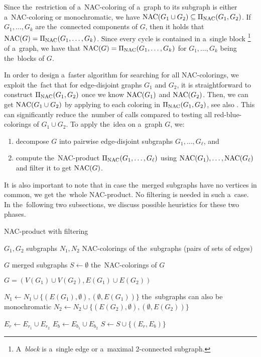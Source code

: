 Since the~restriction of a~NAC-coloring of a~graph
to its subgraph is either a~NAC-coloring or monochromatic,
we have $\operatorname{NAC}(G_{1} \cup G_{2}) \subseteq \operatorname{\Pi_{\operatorname{NAC}}}(G_{1}, G_{2})$.
If~$G_1, \dots, G_k$ are the~connected components of $G$,
then it holds that $\operatorname{NAC}(G) = \operatorname{\Pi_{\operatorname{NAC}}}(G_1,\ldots, G_k)$.
Since every cycle is contained in a~single
block%
\footnote{
	A~\emph{block} is a~single edge or a~maximal 2-connected subgraph.
}
of a~graph, we have that $\operatorname{NAC}(G) = \operatorname{\Pi_{\operatorname{NAC}}}(G_1,\ldots, G_k)$
for $G_1,\ldots, G_k$ being the~blocks of $G$.

In order to design a~faster algorithm for searching for all NAC-colorings,
we exploit the~fact that for edge-disjoint graphs $G_1$ and $G_2$,
it is straightforward to construct $\operatorname{\Pi_{\operatorname{NAC}}}(G_{1}, G_{2})$ once we know $\operatorname{NAC}(G_1)$ and $\operatorname{NAC}(G_2)$.
Then, we can get $\operatorname{NAC}(G_{1} \cup G_{2})$ by applying \IsNACColoring{}
to each coloring in $\operatorname{\Pi_{\operatorname{NAC}}}(G_{1}, G_{2})$, see also .
This can significantly reduce the~number of \IsNACColoring{} calls
compared to testing all red-blue-colorings of $G_{1} \cup G_{2}$.
To apply the~idea on a~graph $G$, we:
%
\begin{enumerate}
	\item decompose $G$ into pairwise edge-disjoint subgraphs $G_1, \ldots, G_\ell$, and
	\item compute the~NAC-product $\operatorname{\Pi_{\operatorname{NAC}}}(G_1, \dots, G_\ell)$ using $\operatorname{NAC}(G_1), \ldots, \operatorname{NAC}(G_\ell)$
	      and filter it to get $\operatorname{NAC}(G)$.
\end{enumerate}
%
It is also important to note that in case the~merged subgraphs
have no vertices in common, we get the~whole NAC-product.
No filtering is needed in such a~case.
%
In the~following two subsections, we discuss possible heuristics
for these two phases.

\begin{algorithm}
	\caption{NAC-product with filtering}%
	\label{alg:coloring_product}
	\begin{algorithmic}[1]
		\Require{} $G_1, G_2$
		\Comment{} subgraphs
		\Require{} $N_1, N_2$
		\Comment{} NAC-colorings of the~subgraphs (pairs of sets of edges)

		\Ensure{} $G$
		\Comment{} merged subgraphs
		\Ensure{} $S \gets \emptyset$
		\Comment{} the~NAC-colorings of $G$

		\State{} $G = (V(G_1)\cup V(G_2), E(G_1) \cup E(G_2))$

		\State{} $N_1 \gets N_1 \cup \{(E(G_1), \emptyset), (\emptyset, E(G_1))\}$
		\Comment{} the~subgraphs can also be monochromatic
		\State{} $N_2 \gets N_2 \cup \{(E(G_2), \emptyset), (\emptyset, E(G_2))\}$

		\State{} $E_r \gets E_{r_{1}} \cup E_{r_{2}}$
		\State{} $E_b \gets E_{b_{1}} \cup E_{b_{2}}$
		\State{} $S \gets S \cup \{(E_r, E_b)\}$
		\EndIf{}
		\EndFor{}
		\EndFor{}
	\end{algorithmic}
\end{algorithm}

